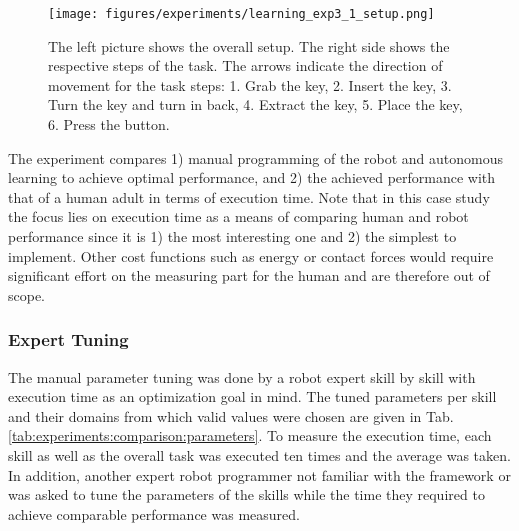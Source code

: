 \begin{figure}[ht!]
\texttt{[image: figures/experiments/learning\_exp3\_1\_setup.png]}
\caption{The left picture shows the overall setup. The right side shows the respective steps of the task. The arrows indicate the direction of movement for the task steps: 1. Grab the key, 2. Insert the key, 3. Turn the key and turn in back, 4. Extract the key, 5. Place the key, 6. Press the button.}
\label{fig:learning:exp3_1:setup}
\end{figure}


The experiment compares 1) manual programming of the robot and autonomous learning to achieve optimal performance, and 2) the achieved performance with that of a human adult in terms of execution time.
Note that in this case study the focus lies on execution time as a means of comparing human and robot performance since it is 1) the most interesting one and 2) the simplest to implement.
Other cost functions such as energy or contact forces would require significant effort on the measuring part for the human and are therefore out of scope.

\subsubsection{Expert Tuning}
The manual parameter tuning was done by a robot expert skill by skill with execution time as an optimization goal in mind.
The tuned parameters per skill and their domains from which valid values were chosen are given in Tab. \ref{tab:experiments:comparison:parameters}.
To measure the execution time, each skill as well as the overall task was executed ten times and the average was taken.
In addition, another expert robot programmer not familiar with the \skillmodelabbr{} framework or \softwareabbr{} was asked to tune the parameters of the skills while the time they required to achieve comparable performance was measured.

